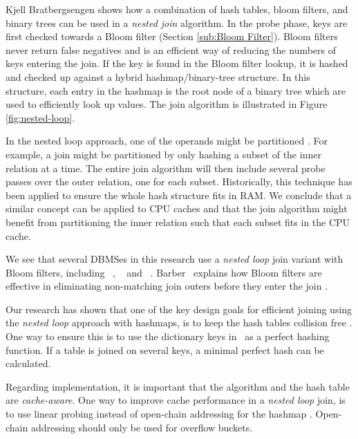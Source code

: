 
Kjell Bratbergsengen shows how a combination of hash tables, bloom filters, and binary trees can be used in a \textit{nested join} algorithm. In the probe phase, keys are first checked towards a Bloom filter (Section \ref{sub:Bloom Filter}). Bloom filters never return false negatives and is an efficient way of reducing the numbers of keys entering the join. If the key is found in the Bloom filter lookup, it is hashed and checked up against a hybrid hashmap/binary-tree structure. In this structure, each entry in the hashmap is the root node of a binary tree which are used to efficiently look up values. The join algorithm is illustrated in Figure \ref{fig:nested-loop}.

In the nested loop approach, one of the operands might be partitioned \cite{Bratbergsengen2015-ed}. For example, a join might be partitioned by only hashing a subset of the inner relation at a time. The entire join algorithm will then include several probe passes over the outer relation, one for each subset. Historically, this technique has been applied to ensure the whole hash structure fits in RAM. We conclude that a similar concept can be applied to CPU caches and that the join algorithm might benefit from partitioning the inner relation such that each subset fits in the CPU cache.

We see that several DBMSes in this research use a \textit{nested loop} join variant with Bloom filters, including \oracle~\cite{Lahiri2015-mz}, \ibm~\cite{Raman2013-em} and \blink~\cite{Raman2008-gi}. Barber \ea~explains how Bloom filters are effective in eliminating non-matching join outers before they enter the join \cite{Barber2014-ey}.

Our research has shown that one of the key design goals for efficient joining using the \textit{nested loop} approach with hashmaps, is to keep the hash tables collision free \cite{Raman2008-gi, Raman2013-em}. One way to ensure this is to use the dictionary keys in \de~as a perfect hashing function. If a table is joined on several keys, a minimal perfect hash can be calculated.

Regarding implementation, it is important that the algorithm and the hash table are \textit{cache-aware}. One way to improve cache performance in a \textit{nested loop} join, is to use linear probing instead of open-chain addressing for the hashmap \cite{Raman2008-gi}. Open-chain addressing should only be used for overflow buckets.

